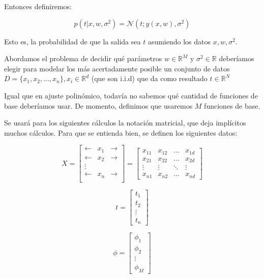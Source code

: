 \documentclass[a4paper,10pt]{article}
\begin{document}
Entonces definiremos:

\begin{equation*}
p(t | x, w, \sigma^2) = \mathcal{N}(t; y(x,w), \sigma^2)
\end{equation*}

Esto es, la probabilidad de que la salida sea $t$ asumiendo los datos $x, w, \sigma^2$.

Abordamos el problema de decidir qué parámetros $w \in \mathbb{R}^M$ y $\sigma^2 \in \mathbb{R}$ deberíamos elegir para modelar los más acertadamente posible un conjunto de datos $D = \{x_1, x_2, \dots, x_n\}, x_i \in \mathbb{R}^d$ (que son i.i.d)
que da como resultado $t \in \mathbb{R}^N$

Igual que en ajuste polinómico, todavía no sabemos qué cantidad de funciones de base deberíamos usar. De momento, definimos que usaremos $M$ funciones de base.

Se usará para los siguientes cálculos la notación matricial, que deja implícitos muchos cálculos. Para que se entienda bien, se definen los siguientes datos:


\begin{equation*}
X = 
\begin{bmatrix}
\leftarrow & x_1 & \rightarrow \\
\leftarrow & x_2 & \rightarrow \\
\vdots \\
\leftarrow & x_n & \rightarrow \\
\end{bmatrix}
=
\begin{bmatrix}
x_{11} & x_{12} & \dots & x_{1d} \\
x_{21} & x_{22} & \dots & x_{2d} \\
\vdots & \vdots & \ddots & \vdots \\
x_{n1} & x_{n2} & \dots & x_{nd}
\end{bmatrix}
\end{equation*}



\begin{equation*}
t = 
\begin{bmatrix}
t_1 \\
t_2 \\
\vdots \\
t_n
\end{bmatrix}
\end{equation*}

\begin{equation*}
\phi = 
\begin{bmatrix}
\phi_1 \\
\phi_2 \\
\vdots \\
\phi_M
\end{bmatrix}
\end{equation*}
\end{document}

